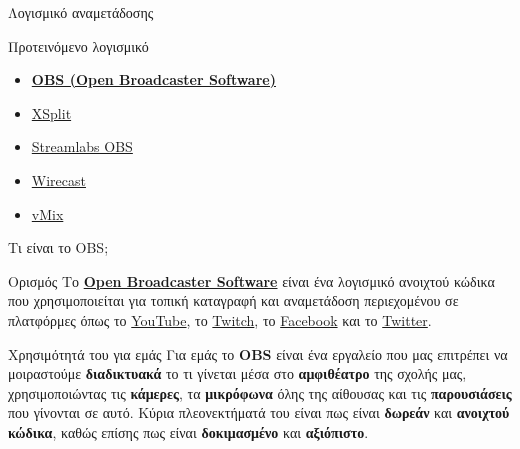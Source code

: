 \documentclass[aspectratio=169]{beamer}
\begin{document}
\begin{frame}{Λογισμικό αναμετάδοσης}
  \begin{exampleblock}{Προτεινόμενο λογισμικό}
    \begin{itemize}
      \item \textbf{\href{https://obsproject.com/}{OBS (Open Broadcaster Software)}}
      \item \href{https://www.xsplit.com/}{XSplit}
      \item \href{https://streamlabs.com/}{Streamlabs OBS}
      \item \href{https://www.telestream.net/wirecast/}{Wirecast}
      \item \href{https://www.vmix.com/}{vMix}
    \end{itemize}

  \end{exampleblock}
\end{frame}
\begin{frame}{Τι είναι το OBS;}
  \begin{block}{Ορισμός}
    Το \textbf{\href{https://obsproject.com/}{Open Broadcaster Software}} είναι ένα λογισμικό ανοιχτού κώδικα που χρησιμοποιείται 
    για τοπική καταγραφή και αναμετάδοση περιεχομένου σε πλατφόρμες όπως το \href{https://www.youtube.com/}{YouTube},
    το \href{https://www.twitch.tv/}{Twitch}, το \href{https://www.facebook.com/}{Facebook} και το \href{https://twitter.com/}{Twitter}.
  \end{block}
  \begin{block}{Χρησιμότητά του για εμάς}
    Για εμάς το \textbf{OBS} είναι ένα εργαλείο που μας επιτρέπει να μοιραστούμε \textbf{διαδικτυακά} το τι γίνεται μέσα στο \textbf{αμφιθέατρο}
    της σχολής μας, χρησιμοποιώντας τις \textbf{κάμερες}, τα \textbf{μικρόφωνα} όλης της αίθουσας και τις \textbf{παρουσιάσεις} που γίνονται σε αυτό. 
    Κύρια πλεονεκτήματά του είναι πως είναι \textbf{δωρεάν} και \textbf{ανοιχτού κώδικα}, καθώς επίσης πως είναι \textbf{δοκιμασμένο} και \textbf{αξιόπιστο}.
  \end{block}
\end{frame}
\end{document}
